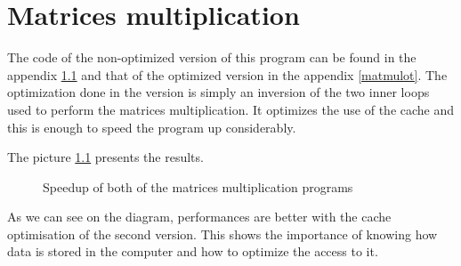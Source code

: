 \chapter{Matrices multiplication}

The code of the non-optimized version of this program can be found in the appendix \ref{matmul} and that of the optimized version in the appendix \ref{matmulot}. 
The optimization done in the version is simply an inversion of the two inner loops used to perform the matrices multiplication. It optimizes the use of the cache and this is enough to speed the program up considerably.

The picture \ref{matmul} presents the results.

\begin{figure}[!h]
  \begin{center}
  \end{center}
  \caption{Speedup of both of the matrices multiplication programs}
  \label{matmul}
\end{figure}

As we can see on the diagram, performances are better with the cache optimisation of the second version. This shows the importance of knowing how data is stored in the computer and how to optimize the access to it.

